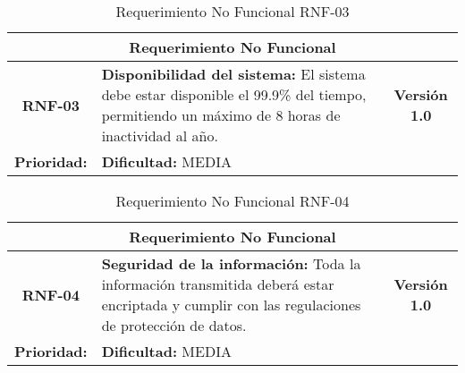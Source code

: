 \begin{table}[h]
\centering
\begin{tabular}{|c|p{10cm}|c|}
\hline
\multicolumn{3}{|c|}{\textbf{Requerimiento No Funcional}} \\ \hline
\textbf{RNF-03} & \textbf{Disponibilidad del sistema:} El sistema debe estar disponible el 99.9\% del tiempo, permitiendo un máximo de 8 horas de inactividad al año. & \textbf{Versión 1.0} \\ \hline
\multicolumn{1}{|l|}{\textbf{Prioridad:}} ALTA & \multicolumn{2}{l|}{\textbf{Dificultad:} MEDIA} \\ \hline
\end{tabular}
\caption{Requerimiento No Funcional RNF-03}
\end{table}
\vspace{1cm} %

\begin{table}[h]
\centering
\begin{tabular}{|c|p{10cm}|c|}
\hline
\multicolumn{3}{|c|}{\textbf{Requerimiento No Funcional}} \\ \hline
\textbf{RNF-04} & \textbf{Seguridad de la información:} Toda la información transmitida deberá estar encriptada y cumplir con las regulaciones de protección de datos. & \textbf{Versión 1.0} \\ \hline
\multicolumn{1}{|l|}{\textbf{Prioridad:}} ALTA & \multicolumn{2}{l|}{\textbf{Dificultad:} MEDIA} \\ \hline
\end{tabular}
\caption{Requerimiento No Funcional RNF-04}
\end{table}
